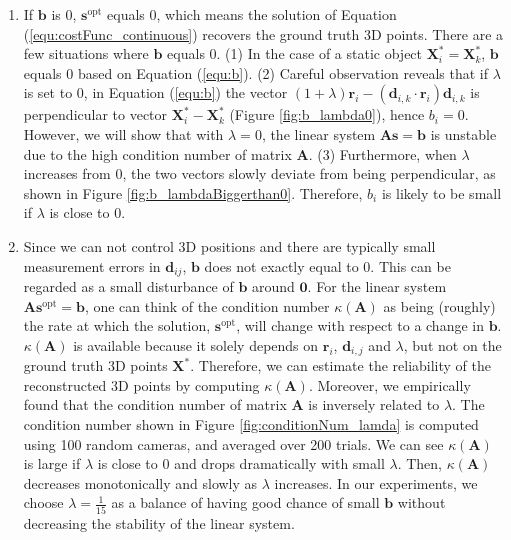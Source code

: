 \begin{enumerate}
\item If $\mathbf{b}$ is 0, $\mathbf{s}^\text{opt}$ equals 0, which means the solution of Equation (\ref{equ:costFunc_continuous}) recovers the ground truth 3D points. There are a few situations where $\mathbf{b}$ equals 0. (1) In the case of a static object $\mathbf{X}_i^* = \mathbf{X}_k^*$, $\mathbf{b}$ equals 0 based on Equation (\ref{equ:b}). (2) Careful observation reveals that if $\lambda$ is set to $0$, in Equation (\ref{equ:b}) the vector $(1+\lambda)\mathbf{r}_i - (\mathbf{d}_{i,k}\cdot \mathbf{r}_i)\mathbf{d}_{i,k}$ is perpendicular to vector $\mathbf{X}_i^*-\mathbf{X}_k^*$ (Figure \ref{fig:b_lambda0}), hence $b_i=0$. However, we will show that with $\lambda=0$, the linear system $\mathbf{A}\mathbf{s}= \mathbf{b}$ is unstable due to the high condition number of matrix $\mathbf{A}$. (3) Furthermore, when $\lambda$ increases from 0, the two vectors slowly deviate from being perpendicular, as shown in Figure \ref{fig:b_lambdaBiggerthan0}. Therefore, $b_i$ is likely to be small if $\lambda$ is close to 0.

\item Since we can not control 3D positions and there are typically small measurement errors in $\mathbf{d}_{ij}$, $\mathbf{b}$ does not exactly equal to 0. This can be regarded as a small disturbance of $\mathbf{b}$ around $\mathbf{0}$. For the linear system $\mathbf{A}\mathbf{s}^\text{opt}= \mathbf{b}$, one can think of the condition number $\kappa(\mathbf A)$ as being (roughly) the rate at which the solution, $\mathbf{s}^{\text{opt}}$, will change with respect to a change in $\mathbf{b}$. $\kappa(\mathbf A)$ is available because it solely depends on $\mathbf{r}_i$, $\mathbf{d}_{i,j}$ and $\lambda$, but not on the ground truth 3D points $\mathbf{X}^*$. Therefore, we can estimate the reliability of the reconstructed 3D points by computing $\kappa(\mathbf A)$. Moreover, we empirically found that the condition number of matrix $\mathbf{A}$ is inversely related to $\lambda$. The condition number shown in Figure \ref{fig:conditionNum_lamda} is computed using 100 random cameras, and averaged over 200 trials. We can see $\kappa(\mathbf A)$ is large if $\lambda$ is close to 0 and drops dramatically with small $\lambda$. Then, $\kappa(\mathbf A)$ decreases monotonically and slowly as $\lambda$ increases. In our experiments, we choose $\lambda=\frac{1}{15}$ as a balance of having good chance of small $\mathbf{b}$ without decreasing the stability of the linear system.
\end{enumerate}

